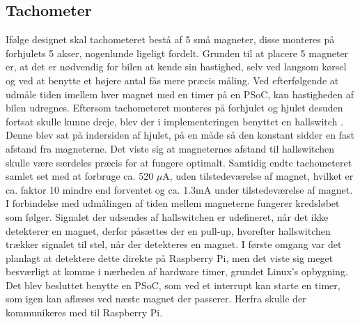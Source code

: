 \subsection{Tachometer}\label{sec:hwi_tacho}

Ifølge designet skal tachometeret bestå af 5 små magneter, disse monteres på forhjulets 5 akser, nogenlunde ligeligt fordelt. 
Grunden til at placere 5 magneter er, at det er nødvendig for bilen at kende sin hastighed, selv ved langsom kørsel og ved at benytte et højere antal fås mere præcis måling.
Ved efterfølgende at udmåle tiden imellem hver magnet med en timer på en PSoC, kan hastigheden af bilen udregnes.
Eftersom tachometeret monteres på forhjulet og hjulet desuden fortsat skulle kunne dreje, blev der i implementeringen benyttet en hallswitch \cite{lib:TLE4905L}. 
Denne blev sat på indersiden af hjulet, på en måde så den konstant sidder en fast afstand fra magneterne. 
Det viste sig at magneternes afstand til hallswitchen skulle være særdeles præcis for at fungere optimalt. 
Samtidig endte tachometeret samlet set med at forbruge ca. 520 $\mu$A, uden tilstedeværelse af magnet, hvilket er ca. faktor 10 mindre end forventet og ca. 1.3mA under tilstedeværelse af magnet. 
I forbindelse med udmålingen af tiden mellem magneterne fungerer kredsløbet som følger. 
Signalet der udsendes af hallswitchen er udefineret, når det ikke detekterer en magnet, derfor påsættes der en pull-up, hvorefter hallswitchen trækker signalet til stel, når der detekteres en magnet. 
I første omgang var det planlagt at detektere dette direkte på Raspberry Pi, men det viste sig meget besværligt at komme i nærheden af hardware timer, grundet Linux's opbygning. 
Det blev  besluttet benytte en PSoC, som ved et interrupt kan starte en timer, som igen kan aflæses ved næste magnet der passerer. 
Herfra skulle der kommunikeres med \IIC til Raspberry Pi. 
 